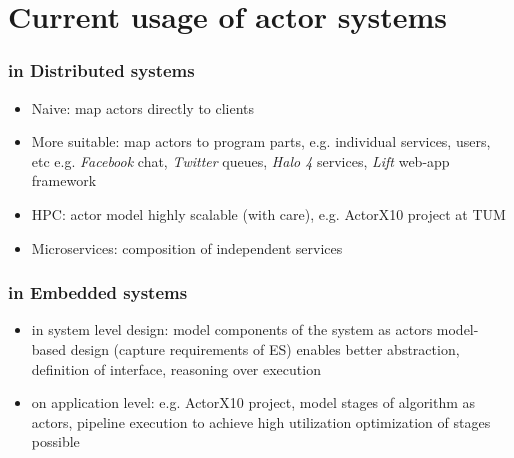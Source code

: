\section{Current usage of actor systems}
\begin{frame}[fragile]
\frametitle{in Distributed systems}
\begin{itemize}
\item Naive: map actors directly to clients
\item More suitable: map actors to program parts, e.g. individual services, users, etc
\textrightarrow e.g. {\it Facebook} chat, {\it Twitter} queues, {\it Halo 4} services, {\it Lift} web-app framework
\item HPC: actor model highly scalable (with care), e.g. ActorX10 project at TUM
\item Microservices: composition of independent services
\end{itemize}
\end{frame}

\begin{frame}
\frametitle{in Embedded systems}
\begin{itemize}
\item in system level design: model components of the system as actors \textrightarrow model-based design (capture requirements of ES) \textrightarrow enables better abstraction, definition of interface, reasoning over execution
\item on application level: e.g. ActorX10 project, model stages of algorithm as actors, pipeline execution to achieve high utilization \textrightarrow optimization of stages possible
\end{itemize}
\end{frame}